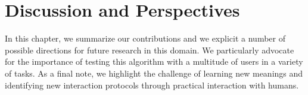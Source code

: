 
\chapter{Discussion and Perspectives}
\label{chapter:conclusion}



In this chapter, we summarize our contributions and we explicit a number of possible directions for future research in this domain. We particularly advocate for the importance of testing this algorithm with a multitude of users in a variety of tasks. As a final note, we highlight the challenge of learning new meanings and identifying new interaction protocols through practical interaction with humans.



